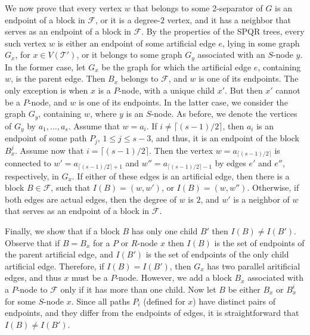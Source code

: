 \documentclass[twoside,leqno,twocolumn]{article}
\newcommand{\tset}{{\mathcal T}}
\newcommand{\fset}{{\mathcal{F}}}
\begin{document}
We now prove that every vertex $w$ that belongs to some 2-separator of $G$ 
is an endpoint of a block in $\fset$, or it is a degree-$2$ vertex, and it has a neighbor that serves as an endpoint of a block in $\fset$. By the properties of the SPQR trees, every such vertex 
$w$ is either an endpoint of some artificial edge $e$, lying in some graph $G_x$, for $x\in V(\tset')$, or it belongs to some graph $G_y$
associated with an $S$-node $y$. In the former case, let  $G_x$ be the graph for which the artificial edge $e$, containing $w$, is the parent edge. Then $B_x$ belongs to $\fset$, and $w$ is one of its endpoints. The only exception is when $x$ is a $P$-node, with a unique child $x'$. But then $x'$ cannot be a $P$-node, and $w$ is one of its endpoints. In the latter case, we consider the graph
$G_y$, containing $w$, where $y$ is an $S$-node. As before, we denote the vertices of $G_y$ by $a_1, \dots, a_s$.
Assume that $w=a_i$. If $i\neq \lceil(s-1)/2\rceil$, then $a_i$ is an endpoint of some path
$P_j$, $1\leq j\leq s-3$, and thus, it is an endpoint of the block $B^j_x$. Assume now that $i=\lceil(s-1)/2\rceil$. Then the vertex 
$w=a_{\lceil(s-1)/2\rceil}$ is connected to $w'=a_{\lceil(s-1)/2\rceil + 1}$ and $w''=a_{\lceil(s-1)/2\rceil - 1}$ by edges $e'$ and $e''$, respectively, in $G_x$. If either of these edges is an artificial edge, then there is a block $B\in \fset$, such that $I(B)=(w,w')$, or $I(B)=(w,w'')$. Otherwise, if both edges are actual edges, then the degree of $w$ is $2$, and $w'$ is a neighbor of $w$ that serves as an endpoint of a block in $\fset$. 


Finally, we show that if a block $B$ has only one child $B'$ then $I(B)\neq I(B')$. Observe that if $B=B_x$ for a $P$ or $R$-node $x$ then $I(B)$ is the set of endpoints of the parent artificial edge, and $I(B')$ is the set of endpoints of the only child artificial edge. Therefore, if $I(B)=I(B')$, then $G_x$ has two parallel aritificial edges, and thus $x$ must be a $P$-node. However, we add a block $B_x$ associated with a $P$-node to $\fset$ only if it has more than one child. Now let $B$ be either $B_x$ or $B_x^i$ for some $S$-node $x$. Since all paths $P_i$ (defined for $x$) have distinct pairs of endpoints, and they differ from the endpoints of edges, it is straightforward that $I(B)\neq I(B')$.
\end{document}
